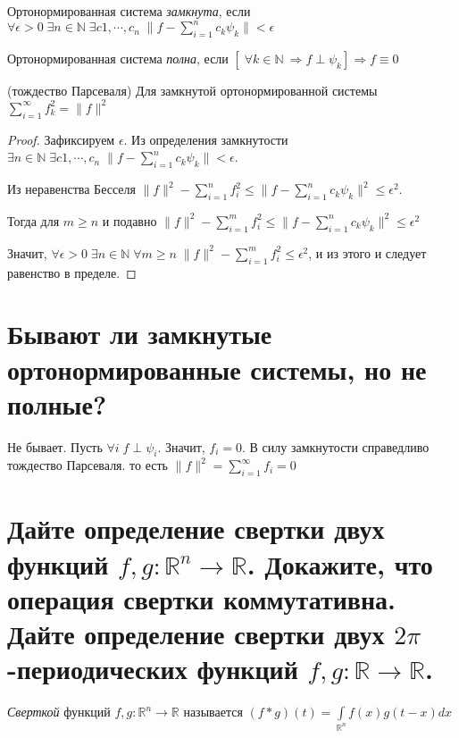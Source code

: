\documentclass{article}
\begin{document}
	\begin{definition}
		Ортонормированная система \textit{замкнута}, если $\forall \epsilon > 0 \; \exists n \in \mathbb{N} \; \exists c1, \cdots, c_n \; \| f-\sum_{i=1}^{n} c_k \psi_k\| < \epsilon$
	\end{definition}

	\begin{definition}
		Ортонормированная система \textit{полна}, если $[\; \forall k \in \mathbb{N} \ \Rightarrow f \perp \psi_k] \Rightarrow f \equiv 0$
	\end{definition}

	\begin{theorem} 
		(тождество Парсеваля) Для замкнутой ортонормированной системы  $\sum_{i=1}^{\infty} f_k^2 = \| f \|^2$ 
	\end{theorem}
	\begin{proof}
		Зафиксируем $\epsilon$.
		Из определения замкнутости $\exists n \in \mathbb{N} \; \exists c1, \cdots, c_n \; \| f-\sum_{i=1}^{n} c_k \psi_k\| < \epsilon$. 
		
		Из неравенства Бесселя $\|f\|^2-\sum_{i=1}^{n} f_i ^2 \le \| f-\sum_{i=1}^{n} c_k \psi_k\|^2 \le \epsilon^2$. 
		
		Тогда для $m \ge n$ и подавно $\|f\|^2-\sum_{i=1}^{m} f_i ^2 \le \| f-\sum_{i=1}^{n} c_k \psi_k\|^2 \le \epsilon^2$
		
		Значит, $\forall \epsilon > 0 \; \exists n \in \mathbb{N} \; \forall m \ge n \; \|f\|^2-\sum_{i=1}^{m} f_i ^2 \le \epsilon^2$, и из этого и следует равенство в пределе.
	\end{proof}
	
	\section{Бывают ли замкнутые ортонормированные системы, но не полные?}
	
	Не бывает. Пусть $\forall i \; f\perp \psi_i$. Значит, $f_i=0$. В силу замкнутости справедливо тождество Парсеваля. то есть $\|f\|^2=\sum_{i=1}^{\infty}f_i=0$
	
	\section{Дайте определение свертки двух функций $f, g: \mathbb{R}^n \to \mathbb{R}$. Докажите, что операция свертки коммутативна. Дайте определение свертки двух $2\pi$-периодических функций $f, g: \mathbb{R} \to \mathbb{R}$.}
	
	\begin{definition}
		\textit{Сверткой} функций $f, g: \mathbb{R}^n \to \mathbb{R}$ называется $(f*g)(t)=\int\limits_{\mathbb{R}^n} f(x)g(t-x)dx$
	\end{definition}
\end{document}
